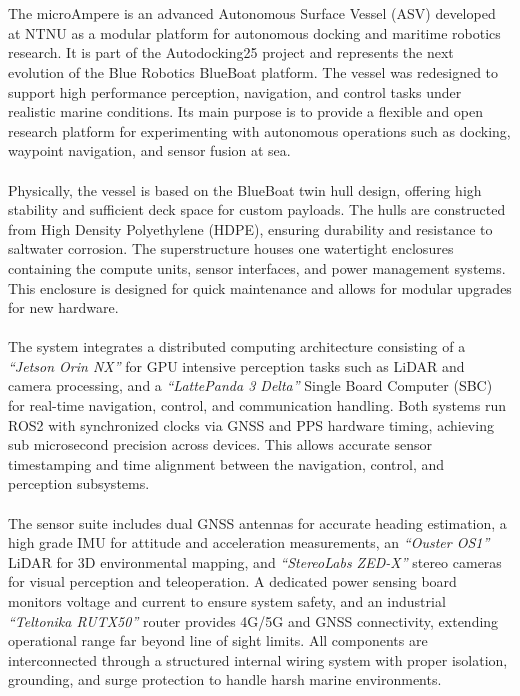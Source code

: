 \\ \\
The microAmpere is an advanced Autonomous Surface Vessel (ASV) developed at NTNU as a modular platform for autonomous docking and maritime robotics research. It is part of the Autodocking25 project  and represents the next evolution of the Blue Robotics BlueBoat platform. The vessel was redesigned to support high performance perception, navigation, and control tasks under realistic marine conditions. Its main purpose is to provide a flexible and open research platform for experimenting with autonomous operations such as docking, waypoint navigation, and sensor fusion at sea.
\\ \\
Physically, the vessel is based on the BlueBoat twin hull design, offering high stability and sufficient deck space for custom payloads. The hulls are constructed from High Density Polyethylene (HDPE), ensuring durability and resistance to saltwater corrosion. The superstructure houses one watertight enclosures containing the compute units, sensor interfaces, and power management systems. This enclosure is designed for quick maintenance and allows for modular upgrades for new hardware.
\\ \\
The system integrates a distributed computing architecture consisting of a \textit{``Jetson Orin NX''} for GPU intensive perception tasks such as LiDAR and camera processing, and a \textit{``LattePanda 3 Delta''} Single Board Computer (SBC) for real-time navigation, control, and communication handling. Both systems run ROS2 with synchronized clocks via GNSS and PPS hardware timing, achieving sub microsecond precision across devices. This allows accurate sensor timestamping and time alignment between the navigation, control, and perception subsystems.
\\ \\
The sensor suite includes dual GNSS antennas for accurate heading estimation, a high grade IMU for attitude and acceleration measurements, an \textit{``Ouster OS1''} LiDAR for 3D environmental mapping, and \textit{``StereoLabs ZED-X''} stereo cameras for visual perception and teleoperation. A dedicated power sensing board monitors voltage and current to ensure system safety, and an industrial \textit{``Teltonika RUTX50''} router provides 4G/5G and GNSS connectivity, extending operational range far beyond line of sight limits. All components are interconnected through a structured internal wiring system with proper isolation, grounding, and surge protection to handle harsh marine environments.
